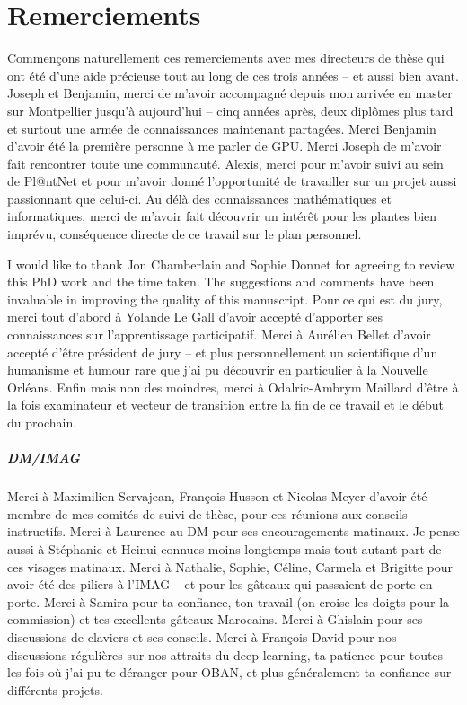 \chapter{Remerciements}


Commençons naturellement ces remerciements avec mes directeurs de thèse qui ont été d'une aide précieuse tout au long de ces trois années -- et aussi bien avant.
Joseph et Benjamin, merci de m'avoir accompagné depuis mon arrivée en master sur Montpellier jusqu'à aujourd'hui -- cinq années après, deux diplômes plus tard et surtout une armée de connaissances maintenant partagées.
Merci Benjamin d'avoir été la première personne à me parler de GPU.
Merci Joseph de m'avoir fait rencontrer toute une communauté.
Alexis, merci pour m'avoir suivi au sein de Pl@ntNet et pour m'avoir donné l'opportunité de travailler sur un projet aussi passionnant que celui-ci.
Au délà des connaissances mathématiques et informatiques, merci de m'avoir fait découvrir un intérêt pour les plantes bien imprévu, conséquence directe de ce travail sur le plan personnel.

\medskip

I would like to thank Jon Chamberlain and Sophie Donnet for agreeing to review this PhD work and the time taken. The suggestions and comments have been invaluable in improving the quality of this manuscript.
Pour ce qui est du jury, merci tout d'abord à Yolande Le Gall d'avoir accepté d'apporter ses connaissances sur l'apprentissage participatif. Merci à Aurélien Bellet d'avoir accepté d'être président de jury -- et plus personnellement un scientifique d'un humanisme et humour rare que j'ai pu découvrir en particulier à la Nouvelle Orléans. Enfin mais non des moindres, merci à Odalric-Ambrym Maillard d'être à la fois examinateur et vecteur de transition entre la fin de ce travail et le début du prochain.

\medskip

\paragraph*{DM/IMAG}
Merci à Maximilien Servajean, François Husson et Nicolas Meyer d'avoir été membre de mes comités de suivi de thèse, pour ces réunions aux conseils instructifs.
Merci à Laurence au DM pour ses encouragements matinaux. Je pense aussi à Stéphanie et Heinui connues moins longtemps mais tout autant part de ces visages matinaux.
Merci à Nathalie, Sophie, Céline, Carmela et Brigitte pour avoir été des piliers à l'IMAG -- et pour les gâteaux qui passaient de porte en porte.
Merci à Samira pour ta confiance, ton travail (on croise les doigts pour la commission) et tes excellents gâteaux Marocains.
Merci à Ghislain pour ses discussions de claviers et ses conseils.
Merci à François-David pour nos discussions régulières sur nos attraits du deep-learning, ta patience pour toutes les fois où j'ai pu te déranger pour OBAN, et plus généralement ta confiance sur différents projets.
\medskip

